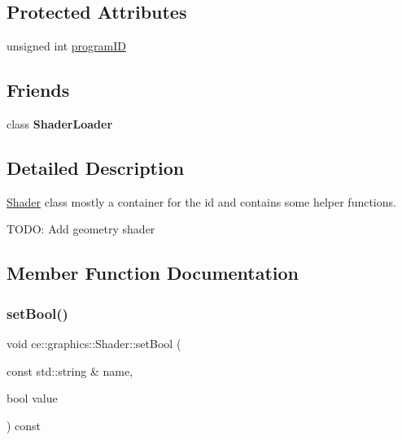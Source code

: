 \subsection*{Protected Attributes}
\begin{DoxyCompactItemize}
\item 
unsigned int \hyperlink{classce_1_1graphics_1_1_shader_a5b5ac3fe6dd6c31fb774d3b670d87c8d}{program\+ID}
\end{DoxyCompactItemize}
\subsection*{Friends}
\begin{DoxyCompactItemize}
\item 
\mbox{\label{classce_1_1graphics_1_1_shader_a1ab9ba285584cda12cc4729fccb36f96}} 
class {\bfseries Shader\+Loader}
\end{DoxyCompactItemize}


\subsection{Detailed Description}
\hyperlink{classce_1_1graphics_1_1_shader}{Shader} class mostly a container for the id and contains some helper functions. 

T\+O\+DO\+: Add geometry shader 

\subsection{Member Function Documentation}
\mbox{\label{classce_1_1graphics_1_1_shader_a42b65349e86147bbd0fc611eeb4f5890}} 
\subsubsection{\texorpdfstring{set\+Bool()}{setBool()}}
{\footnotesize\ttfamily void ce\+::graphics\+::\+Shader\+::set\+Bool (\begin{DoxyParamCaption}\item[{const std\+::string \&}]{name,  }\item[{bool}]{value }\end{DoxyParamCaption}) const}

